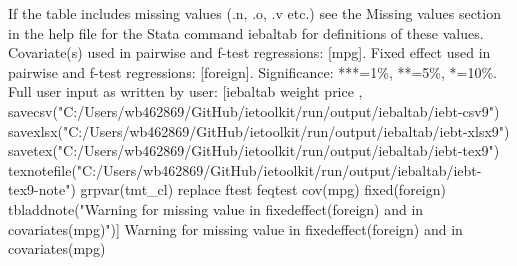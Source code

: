If the table includes missing values (.n, .o, .v etc.) see the Missing values section in the help file for the Stata command iebaltab for definitions of these values. Covariate(s) used in pairwise and f-test regressions: [mpg]. Fixed effect used in pairwise and f-test regressions: [foreign]. Significance: ***=1\%, **=5\%, *=10\%. Full user input as written by user: [iebaltab weight price , savecsv("C:/Users/wb462869/GitHub/ietoolkit/run/output/iebaltab/iebt-csv9") savexlsx("C:/Users/wb462869/GitHub/ietoolkit/run/output/iebaltab/iebt-xlsx9") savetex("C:/Users/wb462869/GitHub/ietoolkit/run/output/iebaltab/iebt-tex9") texnotefile("C:/Users/wb462869/GitHub/ietoolkit/run/output/iebaltab/iebt-tex9-note") grpvar(tmt\_cl) replace ftest feqtest cov(mpg) fixed(foreign) tbladdnote("Warning for missing value in fixedeffect(foreign) and in covariates(mpg)")] Warning for missing value in fixedeffect(foreign) and in covariates(mpg)
